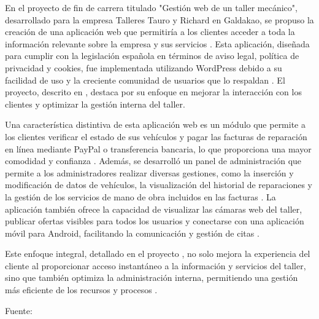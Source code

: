 En el proyecto de fin de carrera titulado "Gestión web de un taller mecánico", desarrollado para la empresa Talleres Tauro y Richard en Galdakao, se propuso la creación de una aplicación web que permitiría a los clientes acceder a toda la información relevante sobre la empresa y sus servicios . Esta aplicación, diseñada para cumplir con la legislación española en términos de aviso legal, política de privacidad y cookies, fue implementada utilizando WordPress debido a su facilidad de uso y la creciente comunidad de usuarios que lo respaldan . El proyecto, descrito en \citep{antecedente2Tesis}, destaca por su enfoque en mejorar la interacción con los clientes y optimizar la gestión interna del taller.

Una característica distintiva de esta aplicación web es un módulo que permite a los clientes verificar el estado de sus vehículos y pagar las facturas de reparación en línea mediante PayPal o transferencia bancaria, lo que proporciona una mayor comodidad y confianza . Además, se desarrolló un panel de administración que permite a los administradores realizar diversas gestiones, como la inserción y modificación de datos de vehículos, la visualización del historial de reparaciones y la gestión de los servicios de mano de obra incluidos en las facturas . La aplicación también ofrece la capacidad de visualizar las cámaras web del taller, publicar ofertas visibles para todos los usuarios y conectarse con una aplicación móvil para Android, facilitando la comunicación y gestión de citas .

Este enfoque integral, detallado en el proyecto \citep{antecedente2Tesis}, no solo mejora la experiencia del cliente al proporcionar acceso instantáneo a la información y servicios del taller, sino que también optimiza la administración interna, permitiendo una gestión más eficiente de los recursos y procesos .

\begin{flushright}
{Fuente: \citep{antecedente2Tesis}}
\end{flushright}



